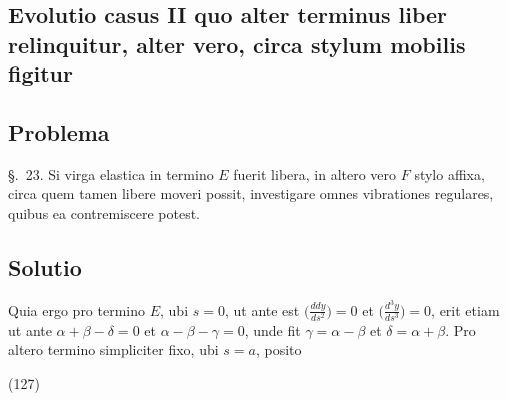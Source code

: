 \documentclass[11pt,a4paper]{article}
\begin{document}
\subsection{Evolutio casus II quo alter terminus liber relinquitur, alter vero, circa stylum mobilis figitur}

\subsection{Problema}

§.~23. Si virga elastica in termino $E$ fuerit libera, in altero vero $F$ stylo
affixa, circa quem tamen libere moveri possit, investigare omnes vibrationes
regulares, quibus ea contremiscere potest.

\subsection{Solutio}

Quia ergo pro termino $E$, ubi $s = 0$, ut ante est
$\bigl(\frac{ddy}{ds^2}\bigr) = 0$ et $\bigl(\frac{d^3y}{ds^3}\bigr) = 0$, erit etiam ut
ante $\alpha + \beta - \delta = 0$ et $\alpha - \beta - \gamma = 0$, unde fit
$\gamma = \alpha - \beta$ et $\delta = \alpha + \beta$. Pro altero termino simpliciter
fixo, ubi $s = a$, posito

(127)
\end{document}
